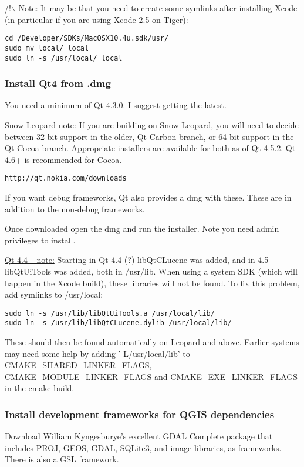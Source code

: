 /!$\backslash$ Note: It may be that you need to create some symlinks after installing 
Xcode (in particular if you are using Xcode 2.5 on Tiger):

\begin{verbatim}
cd /Developer/SDKs/MacOSX10.4u.sdk/usr/
sudo mv local/ local_
sudo ln -s /usr/local/ local
\end{verbatim}

\subsubsection{Install Qt4 from .dmg}
You need a minimum of Qt-4.3.0. I suggest getting the latest.

\underline{Snow Leopard note:} If you are building on Snow Leopard, you will need to
decide between 32-bit support in the older, Qt Carbon branch, or 64-bit
support in the Qt Cocoa branch. Appropriate installers are available for both
as of Qt-4.5.2.  Qt 4.6+ is recommended for Cocoa.

\begin{verbatim}
http://qt.nokia.com/downloads
\end{verbatim}

If you want debug frameworks, Qt also provides a dmg with these.  These are in
addition to the non-debug frameworks.

Once downloaded open the dmg and run the installer. Note you need admin
privileges to install.

\underline{Qt 4.4+ note:} Starting in Qt 4.4 (?) libQtCLucene was added, and in 4.5
libQtUiTools was added, both in /usr/lib.  When using a system SDK (which will
happen in the Xcode build), these libraries will not be found.  To fix this problem,
add symlinks to /usr/local:

\begin{verbatim}
sudo ln -s /usr/lib/libQtUiTools.a /usr/local/lib/
sudo ln -s /usr/lib/libQtCLucene.dylib /usr/local/lib/
\end{verbatim}

These should then be found automatically on Leopard and above.  Earlier systems
may need some help by adding '-L/usr/local/lib' to CMAKE\_SHARED\_LINKER\_FLAGS,
CMAKE\_MODULE\_LINKER\_FLAGS and CMAKE\_EXE\_LINKER\_FLAGS in the cmake build.

\subsubsection{Install development frameworks for QGIS dependencies}
Download William Kyngesburye's excellent GDAL Complete package that includes
PROJ, GEOS, GDAL, SQLite3, and image libraries, as frameworks.  There is also
a GSL framework.


